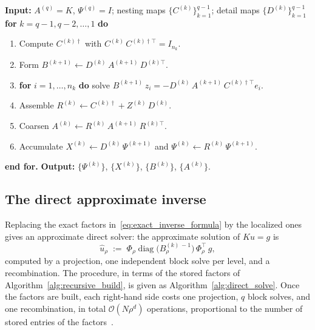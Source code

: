 \begin{algorithm}[t]
\caption{Exact OAW construction}
\label{alg:exact_build}
\textbf{Input:} $A^{(q)} = K$, $\Psi^{(q)} = I$; nesting maps
$\{C^{(k)}\}_{k=1}^{q-1}$; detail maps $\{D^{(k)}\}_{k=1}^{q-1}$\\[4pt]
\textbf{for} $k = q-1, q-2, \ldots, 1$ \textbf{do}
\begin{enumerate}
  \item[1.] Compute $C^{(k)\dagger}$ with $C^{(k)}\,C^{(k)\dagger\top} = I_{n_k}$.
  \item[2.] Form $B^{(k+1)} \gets D^{(k)}\,A^{(k+1)}\,D^{(k)\top}$.
  \item[3.] \textbf{for} $i = 1, \ldots, n_k$ \textbf{do} solve
    $B^{(k+1)}\, z_i = -D^{(k)}\,A^{(k+1)}\,C^{(k)\dagger\top} e_i$.
  \item[4.] Assemble $R^{(k)} \gets C^{(k)\dagger} + Z^{(k)}\,D^{(k)}$.
  \item[5.] Coarsen $A^{(k)} \gets R^{(k)}\,A^{(k+1)}\,R^{(k)\top}$.
  \item[6.] Accumulate $X^{(k)} \gets D^{(k)}\,\Psi^{(k+1)}$ and
    $\Psi^{(k)} \gets R^{(k)}\,\Psi^{(k+1)}$.
\end{enumerate}
\textbf{end for.}  \textbf{Output:} $\{\Psi^{(k)}\}$, $\{X^{(k)}\}$,
$\{B^{(k)}\}$, $\{A^{(k)}\}$.
\end{algorithm}

\subsection{The direct approximate inverse}
\label{sec:background:apply}

Replacing the exact factors in~\eqref{eq:exact_inverse_formula} by the
localized ones gives an approximate direct solver: the approximate solution
of $Ku = g$ is
\begin{equation}\label{eq:localized_inverse}
  \hat{u}_\rho \;:=\;
  \Phi_\rho \operatorname{diag}\bigl( B^{(k)\,-1}_\rho \bigr)\,
  \Phi_\rho^\top\, g ,
\end{equation}
computed by a projection, one independent block solve per level, and a
recombination.  The procedure, in terms of the stored factors of
Algorithm~\ref{alg:recursive_build}, is given as
Algorithm~\ref{alg:direct_solve}.  Once the factors are built, each
right-hand side costs one projection, $q$ block solves, and one
recombination, in total $\mathcal{O}(N\rho^{d})$ operations, proportional
to the number of stored entries of the factors~\cite{owhadi2017}.


